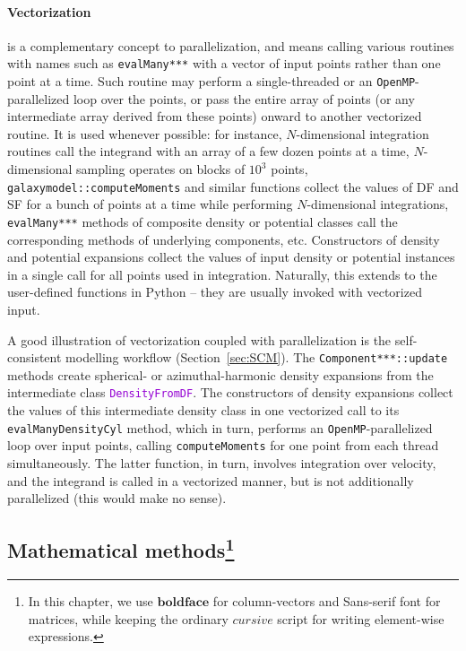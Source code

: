 \documentclass[12pt]{article}
\newcommand{\ttt}[1]{\textcolor{darkviolet}{\texttt{#1}}}
\let\oldparagraph\paragraph
\renewcommand{\paragraph}[1]{\vspace{-2mm}\oldparagraph{#1}}
\begin{document}
\paragraph{Vectorization}  is a complementary concept to parallelization, and means calling various routines with names such as \texttt{evalMany***} with a vector of input points rather than one point at a time. Such routine may perform a single-threaded or an \texttt{OpenMP}-parallelized loop over the points, or pass the entire array of points (or any intermediate array derived from these points) onward to another vectorized routine. It is used whenever possible: for instance, $N$-dimensional integration routines call the integrand with an array of a few dozen points at a time, $N$-dimensional sampling operates on blocks of $10^3$ points, \texttt{galaxymodel::computeMoments} and similar functions collect the values of DF and SF for a bunch of points at a time while performing $N$-dimensional integrations, \texttt{evalMany***} methods of composite density or potential classes call the corresponding methods of underlying components, etc. Constructors of density and potential expansions collect the values of input density or potential instances in a single call for all points used in integration. Naturally, this extends to the user-defined functions in Python -- they are usually invoked with vectorized input. 

A good illustration of vectorization coupled with parallelization is the self-consistent modelling workflow (Section~\ref{sec:SCM}). The \texttt{Component***::update} methods create spherical- or azimuthal-harmonic density expansions from the intermediate class \ttt{DensityFromDF}. The constructors of density expansions collect the values of this intermediate density class in one vectorized call to its \texttt{evalManyDensityCyl} method, which in turn, performs an \texttt{OpenMP}-parallelized loop over input points, calling \texttt{computeMoments} for one point from each thread simultaneously. The latter function, in turn, involves integration over velocity, and the integrand is called in a vectorized manner, but is not additionally parallelized (this would make no sense).

\subsection[Mathematical methods]
{Mathematical methods\protect\footnote{
In this chapter, we use $\boldsymbol{boldface}$ for column-vectors and \textsf{Sans-serif} font for matrices, while keeping the ordinary $cursive$ script for writing element-wise expressions.}}
\end{document}

